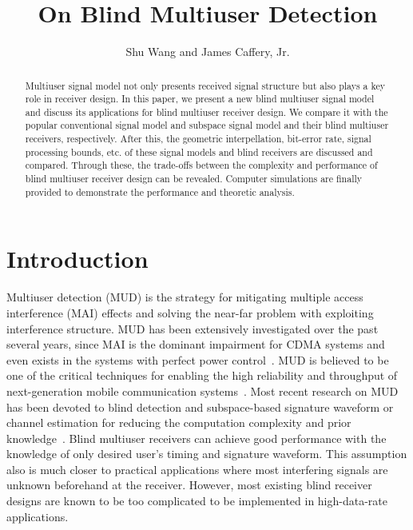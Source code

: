 \documentclass[a4paper,10pt,fleqn, twocolumn]{IEEETran}
\title{On Blind Multiuser Detection}
\author{Shu Wang and James Caffery, Jr.}
\date{}
\begin{document}
\maketitle
\begin{abstract}\small
Multiuser signal model not only presents received signal structure
but also plays a key role in receiver design. In this paper, we
present a new blind multiuser signal model and discuss its
applications for blind multiuser receiver design. We compare it
with the popular conventional signal model and subspace signal
model and their blind multiuser receivers, respectively. After
this, the geometric interpellation, bit-error rate, signal
processing bounds, etc. of these signal models and blind receivers
are discussed and compared. Through these, the trade-offs between
the complexity and performance of blind multiuser receiver design
can be revealed. Computer simulations are finally provided to
demonstrate the performance and theoretic analysis.
\end{abstract}

\section{Introduction}
Multiuser detection (MUD) is the strategy for mitigating multiple
access interference (MAI) effects and solving the near-far problem
with exploiting interference structure. MUD has been extensively
investigated over the past several years, since MAI is the
dominant impairment for CDMA systems and even exists in the
systems with perfect power control~\cite{Verd98}. MUD is believed
to be one of the critical techniques for enabling the high
reliability and throughput of next-generation mobile communication
systems~\cite{Andr05}. Most recent research on MUD has been
devoted to blind detection and subspace-based signature waveform
or channel estimation for reducing the computation complexity and
prior knowledge~\cite{Honi95,Torl97,Wang98,Zhang02,Wang05B}. Blind
multiuser receivers can achieve good performance with the
knowledge of only desired user's timing and signature waveform.
This assumption also is much closer to practical applications
where most interfering signals are unknown beforehand at the
receiver. However, most existing blind receiver designs are known
to be too complicated to be implemented in high-data-rate
applications.
\end{document}
